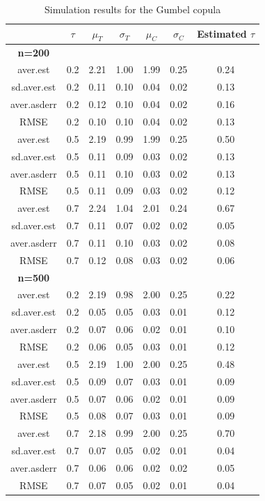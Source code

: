 \begin{table}[h]
    \centering
    \caption{Simulation results for the Gumbel copula}
    \begin{tabular}{|c|c|c|c|c|c|c|}
        \hline
        & \(\tau\) & \(\mu_T\) & \(\sigma_T\) & \(\mu_C\) & \(\sigma_C\) & Estimated \(\tau\) \\ 
        \hline
        \textbf{n=200} & & & & & & \\
        \hline
        aver.est    & 0.2 & 2.21 & 1.00 & 1.99 & 0.25 & 0.24 \\ 
        sd.aver.est & 0.2 & 0.11 & 0.10 & 0.04 & 0.02 & 0.13 \\ 
        aver.asderr & 0.2 & 0.12 & 0.10 & 0.04 & 0.02 & 0.16 \\ 
        RMSE        & 0.2 & 0.10 & 0.10 & 0.04 & 0.02 & 0.13 \\ 
        \hline
        aver.est    & 0.5 & 2.19 & 0.99 & 1.99 & 0.25 & 0.50 \\ 
        sd.aver.est & 0.5 & 0.11 & 0.09 & 0.03 & 0.02 & 0.13 \\ 
        aver.asderr & 0.5 & 0.11 & 0.10 & 0.03 & 0.02 & 0.13 \\ 
        RMSE        & 0.5 & 0.11 & 0.09 & 0.03 & 0.02 & 0.12 \\ 
        \hline
        aver.est    & 0.7 & 2.24 & 1.04 & 2.01 & 0.24 & 0.67 \\ 
        sd.aver.est & 0.7 & 0.11 & 0.07 & 0.02 & 0.02 & 0.05 \\ 
        aver.asderr & 0.7 & 0.11 & 0.10 & 0.03 & 0.02 & 0.08 \\ 
        RMSE        & 0.7 & 0.12 & 0.08 & 0.03 & 0.02 & 0.06 \\ 
        \hline
        \textbf{n=500} & & & & & & \\
        \hline
        aver.est    & 0.2 & 2.19 & 0.98 & 2.00 & 0.25 & 0.22 \\ 
        sd.aver.est & 0.2 & 0.05 & 0.05 & 0.03 & 0.01 & 0.12 \\ 
        aver.asderr & 0.2 & 0.07 & 0.06 & 0.02 & 0.01 & 0.10 \\ 
        RMSE        & 0.2 & 0.06 & 0.05 & 0.03 & 0.01 & 0.12 \\ 
        \hline
        aver.est    & 0.5 & 2.19 & 1.00 & 2.00 & 0.25 & 0.48 \\ 
        sd.aver.est & 0.5 & 0.09 & 0.07 & 0.03 & 0.01 & 0.09 \\ 
        aver.asderr & 0.5 & 0.07 & 0.06 & 0.02 & 0.01 & 0.09 \\ 
        RMSE        & 0.5 & 0.08 & 0.07 & 0.03 & 0.01 & 0.09 \\ 
        \hline
        aver.est    & 0.7 & 2.18 & 0.99 & 2.00 & 0.25 & 0.70 \\ 
        sd.aver.est & 0.7 & 0.07 & 0.05 & 0.02 & 0.01 & 0.04 \\ 
        aver.asderr & 0.7 & 0.06 & 0.06 & 0.02 & 0.02 & 0.05 \\ 
        RMSE        & 0.7 & 0.07 & 0.05 & 0.02 & 0.01 & 0.04 \\ 
        \hline
    \end{tabular}
    \label{tab:gumbel_results}
\end{table}

